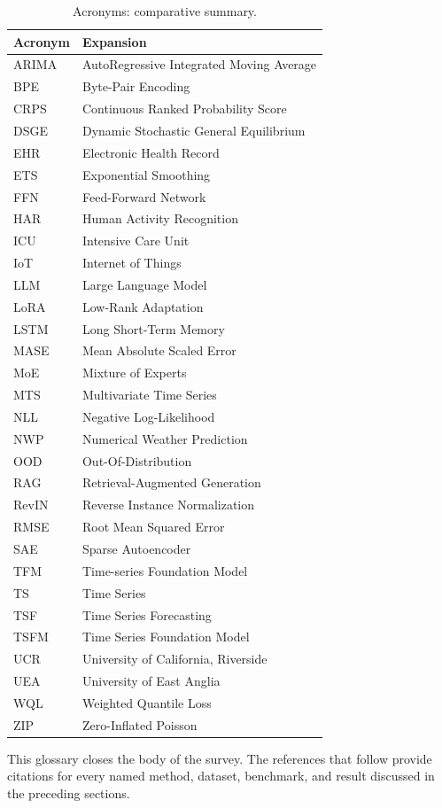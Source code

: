 \documentclass{article}
\begin{document}
\begin{table}[t]
\centering
\caption{Acronyms: comparative summary.}
\label{tab:acronyms}
\begin{tabular}{ll}
\toprule
Acronym & Expansion \\
\midrule
ARIMA & AutoRegressive Integrated Moving Average \\
BPE & Byte-Pair Encoding \\
CRPS & Continuous Ranked Probability Score \\
DSGE & Dynamic Stochastic General Equilibrium \\
EHR & Electronic Health Record \\
ETS & Exponential Smoothing \\
FFN & Feed-Forward Network \\
HAR & Human Activity Recognition \\
ICU & Intensive Care Unit \\
IoT & Internet of Things \\
LLM & Large Language Model \\
LoRA & Low-Rank Adaptation \\
LSTM & Long Short-Term Memory \\
MASE & Mean Absolute Scaled Error \\
MoE & Mixture of Experts \\
MTS & Multivariate Time Series \\
NLL & Negative Log-Likelihood \\
NWP & Numerical Weather Prediction \\
OOD & Out-Of-Distribution \\
RAG & Retrieval-Augmented Generation \\
RevIN & Reverse Instance Normalization \\
RMSE & Root Mean Squared Error \\
SAE & Sparse Autoencoder \\
TFM & Time-series Foundation Model \\
TS & Time Series \\
TSF & Time Series Forecasting \\
TSFM & Time Series Foundation Model \\
UCR & University of California, Riverside \\
UEA & University of East Anglia \\
WQL & Weighted Quantile Loss \\
ZIP & Zero-Inflated Poisson \\
\end{tabular}
\end{table}

This glossary closes the body of the survey. The references that follow provide citations for every named method, dataset, benchmark, and result discussed in the preceding sections.



\end{document}
